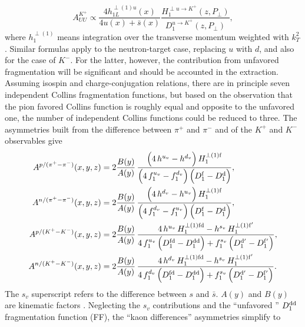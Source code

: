 %
\begin{equation}
\label{eq:pi}
A^{K^+}_{UU} \propto \frac{4h_{1L}^{\perp (1) u}(x)}{4u(x)+\bar{s}(x)}
\frac{H_1^{\perp u \rightarrow K^+}(z,P_{\perp})}{D_1^{ u \rightarrow K^+}(z,P_{\perp})},
\end{equation}
%
\noindent where $h_{1}^{\perp (1)}$ means integration over the transverse momentum weighted with $k_T^2$. Similar formulas apply to the neutron-target case, replacing $u$ with $d$, and also for the case of $K^-$. For the latter, however, the contribution from unfavored fragmentation will be significant and should be accounted in the extraction.
%
Assuming isospin and charge-conjugation relations, there are in principle seven independent Collins fragmentation functions, but based on the observation that the pion favored Collins function is roughly equal and opposite to the unfavored one, the number of independent Collins functions could be reduced to three.
%
The asymmetries built from the difference between $\pi^+$ and $\pi^-$  and of
the $K^+$ and $K^-$ observables give
\begin{align}
A^{p/(\pi^+-\pi^-)}(x,y,z) &= 2\frac{B(y)}{A(y)}\,
\frac{\Bigl(4\,h^{u_v} -h^{d_v}\Bigr)\,H_1^{\perp (1) \rm{f}} }
{\Bigl(4\,f_1^{u_v} - f_1^{d_v}\Bigr)\,\Bigl(D_1^{\rm{f}}-D_1^{\rm{d}}\Bigr)},
\\
A^{n/(\pi^+-\pi^-)}(x,y,z) &= 2\frac{B(y)}{A(y)}\,
\frac{\Bigl(4\,h^{d_v} -h^{u_v}\Bigr)\,H_1^{\perp (1) \rm{f}} }
{\Bigl(4\,f_1^{d_v} - f_1^{u_v}\Bigr)\,\Bigl(D_1^{\rm{f}}-D_1^{\rm{d}}\Bigr)},
\\
A^{p/(K^+-K^-)}(x,y,z) &= 2\frac{B(y)}{A(y)}\,
\frac{4\,h^{u_v}\,H_1^{\perp (1) \rm{fd}} -h^{s_v}\,H_1^{\perp (1) \rm{f'}}  }
{4\,f_1^{u_v}\,\Bigl(D_1^{\rm{fd}} -D_1^{\rm{dd}}\Bigr)
+f_1^{s_v}\,\Bigl(D_1^{\rm{d'}}-D_1^{\rm{f'}}\Bigr)},
\\
A^{n/(K^+-K^-)}(x,y,z) &= 2\frac{B(y)}{A(y)}\,
\frac{4\,h^{d_v}\,H_1^{\perp (1) \rm{fd}} -h^{s_v}\,H_1^{\perp (1) \rm{f'}}  }
{4\,f_1^{d_v}\,\Bigl(D_1^{\rm{fd}} -D_1^{\rm{dd}}\Bigr)
+f_1^{s_v}\,\Bigl(D_1^{\rm{d'}}-D_1^{\rm{f'}}\Bigr)}.
\end{align}
%
%
The $s_v$ superscript refers to the difference between $s$ and
$\bar{s}$. $A(y)$ and $B(y)$ are kinematic factors \cite{Bacchetta:2006tn}.
Neglecting the $s_v$ contributions and  the ``unfavored '' $D_1^{\rm{dd}}$
fragmentation function (FF), the ``kaon differences'' asymmetries simplify
to
